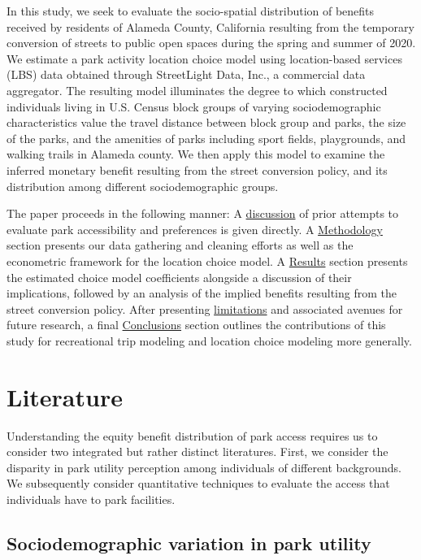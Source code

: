 \documentclass[3p, authoryear]{elsarticle} %
\begin{document}
In this study, we seek to evaluate the socio-spatial distribution of benefits
received by residents of Alameda County, California resulting from the
temporary conversion of streets to public open spaces during the spring and summer
of 2020. We estimate a park activity location choice model using location-based
services (LBS) data obtained through StreetLight Data, Inc., a commercial data
aggregator. The resulting model illuminates the degree to which constructed
individuals living in U.S. Census block groups of varying sociodemographic
characteristics value the travel distance between block group and parks, the
size of the parks, and the amenities of parks including sport fields,
playgrounds, and walking trails in Alameda county. We then apply this model to
examine the inferred monetary benefit resulting from the street conversion
policy, and its distribution among different sociodemographic groups.

The paper proceeds in the following manner: A \protect\hyperlink{literature}{discussion} of prior attempts to
evaluate park accessibility and preferences is given directly. A \protect\hyperlink{methodology}{Methodology}
section presents our data gathering and cleaning efforts as well as the
econometric framework for the location choice model. A \protect\hyperlink{results}{Results} section
presents the estimated choice model coefficients alongside a discussion of their
implications, followed by an analysis of the implied benefits resulting from the
street conversion policy. After presenting \protect\hyperlink{limitations}{limitations} and associated avenues
for future research, a final \protect\hyperlink{conclusions}{Conclusions} section outlines the contributions of
this study for recreational trip modeling and location choice modeling more
generally.

\hypertarget{literature}{%
\section{Literature}\label{literature}}

Understanding the equity benefit distribution of park access
requires us to consider two integrated but rather distinct literatures.
First, we consider the disparity in park utility perception among individuals of
different backgrounds. We subsequently consider quantitative techniques to
evaluate the access that individuals have to park facilities.

\hypertarget{sociodemographic-variation-in-park-utility}{%
\subsection{Sociodemographic variation in park utility}\label{sociodemographic-variation-in-park-utility}}
\end{document}
